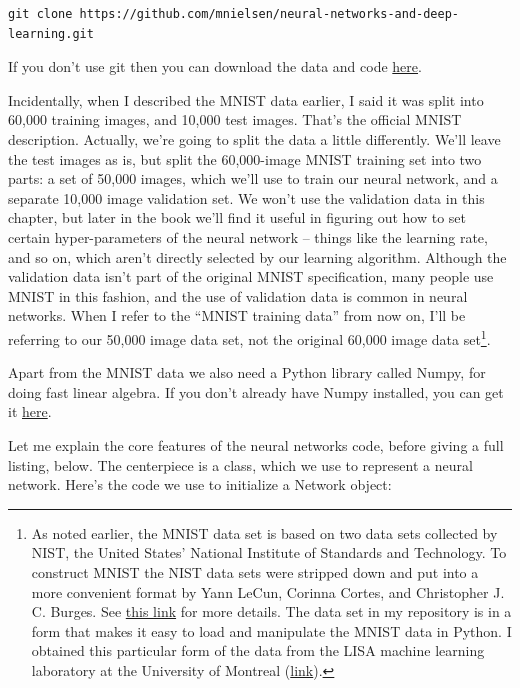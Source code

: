 \documentclass[a4paper,twoside,10pt]{book}
\begin{document}
\begin{lstlisting}
git clone https://github.com/mnielsen/neural-networks-and-deep-learning.git
\end{lstlisting}
If you don't use git then you can download the data and code \href{https://github.com/mnielsen/neural-networks-and-deep-learning/archive/master.zip}{here}.

Incidentally, when I described the MNIST data earlier, I said it was split into 60,000 training images, and 10,000 test images. That's the official MNIST description. Actually, we're going to split the data a little differently. We'll leave the test images as is, but split the 60,000-image MNIST training set into two parts: a set of 50,000 images, which we'll use to train our neural network, and a separate 10,000 image validation set. We won't use the validation data in this chapter, but later in the book we'll find it useful in figuring out how to set certain hyper-parameters of the neural network -- things like the learning rate, and so on, which aren't directly selected by our learning algorithm. Although the validation data isn't part of the original MNIST specification, many people use MNIST in this fashion, and the use of validation data is common in neural networks. When I refer to the ``MNIST training data'' from now on, I'll be referring to our 50,000 image data set, not the original 60,000 image data set\footnote{As noted earlier, the MNIST data set is based on two data sets collected by NIST, the United States' National Institute of Standards and Technology. To construct MNIST the NIST data sets were stripped down and put into a more convenient format by Yann LeCun, Corinna Cortes, and Christopher J. C. Burges. See \href{http://yann.lecun.com/exdb/mnist/}{this link} for more details. The data set in my repository is in a form that makes it easy to load and manipulate the MNIST data in Python. I obtained this particular form of the data from the LISA machine learning laboratory at the University of Montreal (\href{http://www.deeplearning.net/tutorial/gettingstarted.html}{link}).}.

Apart from the MNIST data we also need a Python library called Numpy, for doing fast linear algebra. If you don't already have Numpy installed, you can get it \href{http://www.scipy.org/install.html}{here}.

Let me explain the core features of the neural networks code, before giving a full listing, below. The centerpiece is a  class, which we use to represent a neural network. Here's the code we use to initialize a Network object:
\end{document}
